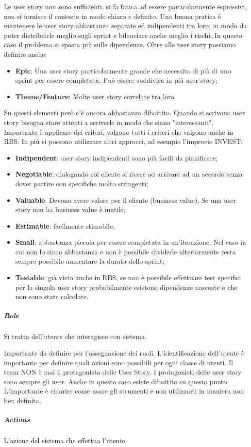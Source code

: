 Le user story non sono sufficienti, si fa fatica ad essere particolarmente espressivi, non si fornisce il contesto in modo chiaro e definito.
Una buona pratica è mantenere le user story abbastanza separate ed indipendenti tra loro, in modo da poter distribuirle meglio sugli sprint e bilanciare anche meglio i rischi. In questo caso il problema si sposta più sulle dipendenze.
Oltre alle user story possiamo definire anche:
\begin{itemize}
	\item \textbf{Epic}: Una user story particolarmente grande che necessita di più di uno sprint per essere completata. Può essere suddivisa in più user story;
	\item \textbf{Theme/Feature}: Molte user story correlate tra loro
\end{itemize}
Su questi elementi però c'è ancora abbastanza dibattito.
Quando si scrivono user story bisogna stare attenti a scriverle in modo che siano "interessanti". Importante è applicare dei criteri, valgono tutti i criteri che valgono anche in RBS. In più si possono utilizzare altri approcci, ad esempio l'improcio INVEST:
\begin{itemize}
	\item \textbf{Indipendent}: user story indipendenti sono più facili da pianificare;
	\item \textbf{Negotiable}: dialogando col cliente si riesce ad arrivare ad un accordo senza dover partire con specifiche molto stringenti;
	\item \textbf{Valuable}: Devono avere valore per il cliente (business value). Se una user story non ha business value è inutile;
	\item \textbf{Estimable}: facilmente stimabile;
	\item \textbf{Small}: abbastanza piccola per essere completata in un'iterazione. Nel caso in cui non lo siano abbastanza e non è possibile dividerle ulteriormente resta sempre possibile aumentare la durata dello sprint;
	\item \textbf{Testable}: già visto anche in RBS, se non è possibile effettuare test specifici per la singola user story probabilmente esistono dipendenze nascoste o che non sono state calcolate.
\end{itemize}
\subparagraph{Role}
Si tratta dell'utente che interagisce con sistema.

\noindent Importante da definire per l'assegnazione dei ruoli. L'identificazione dell'utente è importante per definire quali azioni sono possibili per ogni classe di utenti. Il team NON è mai il protagonista delle User Story. I protagonisti delle user story sono sempre gli user. Anche in questo caso esiste dibattito su questo punto. L'importante è chiarire come usare gli strumenti e non utilizzarli in maniera non ben definita.
\subparagraph{Actions}
L'azione del sistema che effettua l'utente.

